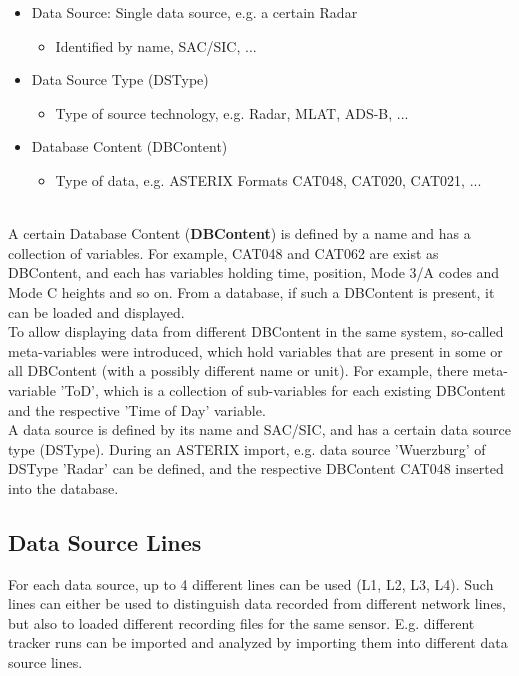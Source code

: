 \begin{itemize}  
    \item Data Source: Single data source, e.g. a certain Radar
    \begin{itemize}  
        \item Identified by name, SAC/SIC, ...
    \end{itemize}
    \item Data Source Type (DSType)
    \begin{itemize}  
        \item Type of source technology, e.g. Radar, MLAT, ADS-B, ...
    \end{itemize}    
    \item Database Content (DBContent)
    \begin{itemize}  
        \item Type of data, e.g. ASTERIX Formats CAT048, CAT020, CAT021, ...
    \end{itemize}        
\end{itemize}
\ \\

A certain Database Content (\textbf{DBContent}) is defined by a name and has a collection of variables. For example, CAT048 and CAT062 are exist as DBContent, and each has variables holding time, position, Mode 3/A codes and Mode C heights and so on. From a database, if such a DBContent is present, it can be loaded and displayed.\\

To allow displaying data from different DBContent in the same system, so-called meta-variables were introduced, which hold variables that are present in some or all DBContent (with a possibly different name or unit).  For example, there meta-variable 'ToD', which is a collection of sub-variables for each existing DBContent and the respective 'Time of Day' variable. \\

A data source is defined by its name and SAC/SIC, and has a certain data source type (DSType). During an ASTERIX import, e.g. data source 'Wuerzburg' of DSType 'Radar' can be defined, and the respective DBContent CAT048 inserted into the database.

\subsection*{Data Source Lines}

For each data source, up to 4 different lines can be used (L1, L2, L3, L4). Such lines can either be used to distinguish data recorded from different network lines, but also to loaded different recording files for the same sensor. E.g. different tracker runs can be imported and analyzed by importing them into different data source lines.


